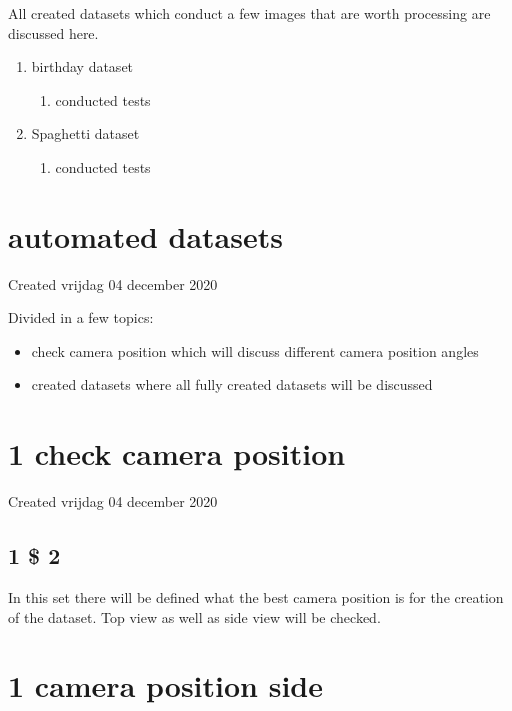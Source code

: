 \documentclass{article}
\begin{document}
	All created datasets which conduct a few images that are worth processing are discussed here. 
	


	\begin{enumerate}[1]
	\item birthday dataset
		\begin{enumerate}[a]
		\item conducted tests
		\end{enumerate}
	\item Spaghetti dataset
		\begin{enumerate}[a]
		\item conducted tests
		\end{enumerate}
	\end{enumerate}

		\section{automated datasets}

Created vrijdag 04 december 2020



Divided in a few topics:



\begin{itemize}
\item check camera position which will discuss different camera position angles
\item created datasets where all fully created datasets will be discussed
\end{itemize}

		\section{1 check camera position}

Created vrijdag 04 december 2020



\subsection{1 \$ 2}

In this set there will be defined what the best camera position is for the creation of the dataset. Top view as well as side view will be checked.


		\section{1 camera position side}
\end{document}
